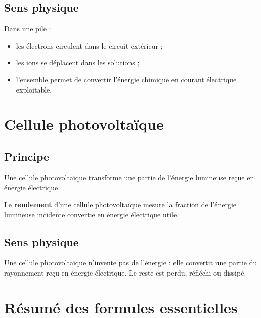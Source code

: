 \documentclass[11pt,a4paper]{article}
\begin{document}
\subsection{Sens physique}

\begin{interpretation}
Dans une pile :
\begin{itemize}
    \item les électrons circulent dans le circuit extérieur ;
    \item les ions se déplacent dans les solutions ;
    \item l'ensemble permet de convertir l'énergie chimique en courant électrique exploitable.
\end{itemize}
\end{interpretation}

\section{Cellule photovoltaïque}

\subsection{Principe}

Une cellule photovoltaïque transforme une partie de l'énergie lumineuse reçue en énergie électrique.

\begin{definitionbox}
Le \textbf{rendement} d'une cellule photovoltaïque mesure la fraction de l'énergie lumineuse incidente convertie en énergie électrique utile.
\end{definitionbox}

\subsection{Sens physique}

\begin{interpretation}
Une cellule photovoltaïque n'invente pas de l'énergie : elle convertit une partie du rayonnement reçu en énergie électrique. Le reste est perdu, réfléchi ou dissipé.
\end{interpretation}

\section{Résumé des formules essentielles}
\end{document}
